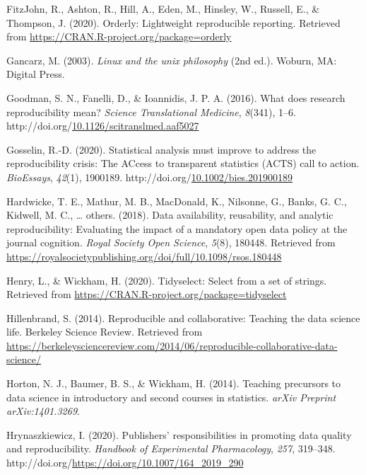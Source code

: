 \documentclass[12pt,twoside]{reedthesis}
\newenvironment{CSLReferences}%
  {}%
  {\par}
\begin{document}
\begin{CSLReferences}{1}{0}
\leavevmode\hypertarget{ref-R-orderly}{}%
FitzJohn, R., Ashton, R., Hill, A., Eden, M., Hinsley, W., Russell, E., \& Thompson, J. (2020). Orderly: Lightweight reproducible reporting. Retrieved from \url{https://CRAN.R-project.org/package=orderly}

\leavevmode\hypertarget{ref-unix}{}%
Gancarz, M. (2003). \emph{Linux and the unix philosophy} (2nd ed.). Woburn, MA: Digital Press.

\leavevmode\hypertarget{ref-Goodman341ps12}{}%
Goodman, S. N., Fanelli, D., \& Ioannidis, J. P. A. (2016). What does research reproducibility mean? \emph{Science Translational Medicine}, \emph{8}(341), 1--6. http://doi.org/\href{https://doi.org/10.1126/scitranslmed.aaf5027}{10.1126/scitranslmed.aaf5027}

\leavevmode\hypertarget{ref-bioessays-gosselin}{}%
Gosselin, R.-D. (2020). Statistical analysis must improve to address the reproducibility crisis: The ACcess to transparent statistics (ACTS) call to action. \emph{BioEssays}, \emph{42}(1), 1900189. http://doi.org/\href{https://doi.org/10.1002/bies.201900189}{10.1002/bies.201900189}

\leavevmode\hypertarget{ref-hardwicke2018data}{}%
Hardwicke, T. E., Mathur, M. B., MacDonald, K., Nilsonne, G., Banks, G. C., Kidwell, M. C., \ldots{} others. (2018). Data availability, reusability, and analytic reproducibility: Evaluating the impact of a mandatory open data policy at the journal cognition. \emph{Royal Society Open Science}, \emph{5}(8), 180448. Retrieved from \url{https://royalsocietypublishing.org/doi/full/10.1098/rsos.180448}

\leavevmode\hypertarget{ref-R-tidyselect}{}%
Henry, L., \& Wickham, H. (2020). Tidyselect: Select from a set of strings. Retrieved from \url{https://CRAN.R-project.org/package=tidyselect}

\leavevmode\hypertarget{ref-berkeley_teaching}{}%
Hillenbrand, S. (2014). Reproducible and collaborative: Teaching the data science life. Berkeley Science Review. Retrieved from \url{https://berkeleysciencereview.com/2014/06/reproducible-collaborative-data-science/}

\leavevmode\hypertarget{ref-horton2014teaching}{}%
Horton, N. J., Baumer, B. S., \& Wickham, H. (2014). Teaching precursors to data science in introductory and second courses in statistics. \emph{arXiv Preprint arXiv:1401.3269}.

\leavevmode\hypertarget{ref-hrynaszkiewicz2020publishers}{}%
Hrynaszkiewicz, I. (2020). Publishers' responsibilities in promoting data quality and reproducibility. \emph{Handbook of Experimental Pharmacology}, \emph{257}, 319--348. http://doi.org/\url{https://doi.org/10.1007/164_2019_290}


\end{CSLReferences}
\end{document}
